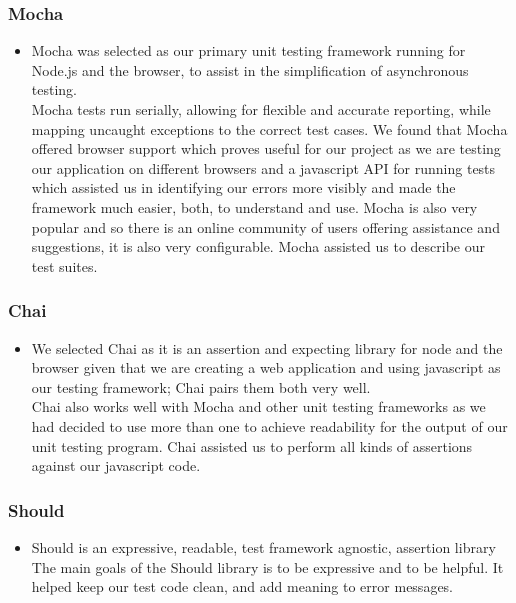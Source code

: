 \subsubsection{Mocha}
\begin{itemize}
	\item Mocha was selected as our primary unit testing framework running for Node.js and the browser,
to assist in the simplification of asynchronous testing. \\
	Mocha tests run serially, allowing
 for flexible and accurate reporting, while mapping uncaught exceptions to the correct test 
 cases. We found that Mocha offered browser support which proves useful for our project as we are testing
our application on different browsers and a javascript API for running tests which assisted us in identifying our 
errors more visibly and made the framework much easier, both, to understand and use. Mocha is also very popular and 
so there is an online community of users offering assistance and suggestions, it is also very configurable. 
Mocha assisted us to describe our test suites.
\end{itemize}

\subsubsection{Chai}
\begin{itemize}
	\item We selected Chai as it is an assertion and expecting library for node and the browser given that we are
creating a web application and using javascript as our testing framework; Chai pairs them 
both very well. \\
Chai also works well with Mocha and other unit testing frameworks as we had
decided to use more than one to achieve readability for the output of our unit testing program. 
Chai assisted us to perform all kinds of assertions against our javascript code.
\end{itemize}

\subsubsection{Should}
\begin{itemize}
	\item Should is an expressive, readable, test framework agnostic, assertion library \\
	The main goals of the Should library is to be expressive and 
to be helpful. It helped keep our test code clean, and add meaning to error messages.
\end{itemize}
	

